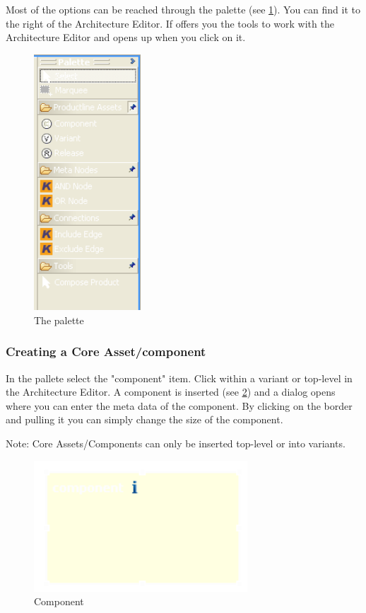 Most of the options can be reached through the palette (see \ref{palette}).
You can find it to the right of the Architecture Editor. If offers you the tools
to work with the Architecture Editor and opens up when you click on it.

\begin{figure}[h!]
\begin{center}
\includegraphics[width=4cm]{palette.png}
   \caption{The palette}
\label{palette}
\end{center}
\end{figure}\par


\subsubsection{Creating a Core Asset/component}

In the pallete select the "component" item. Click within a variant or top-level in 
the Architecture Editor. A component is inserted (see \ref{component}) and a dialog opens where you can enter the meta data of
the component. By clicking on the border and pulling it you can simply change the size of the component. \par
Note: Core Assets/Components can only be inserted top-level or into variants.

\begin{figure}[h!]
\begin{center}
\includegraphics[width=8cm]{component.png}
   \caption{Component}
\label{component}
\end{center}
\end{figure}\par

